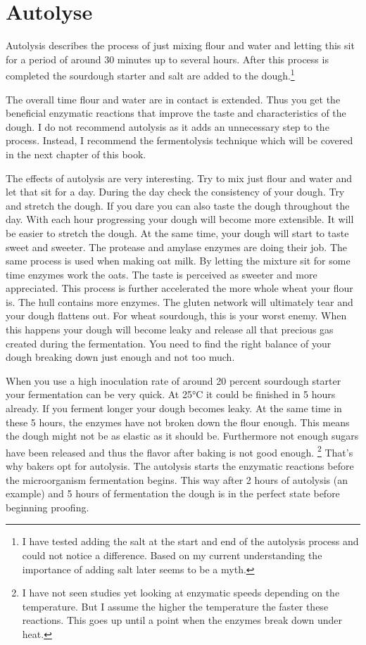 \section{Autolyse}

Autolysis describes the process of just mixing flour and water and letting
this sit for a period of around 30 minutes up to several hours. After this
process is completed the sourdough starter and salt are added to the
dough.\footnote{I have tested adding the salt at the start and end of the
autolysis process and could not notice a difference. Based on my current
understanding the importance of adding salt later seems to be a myth.}

The overall time flour and water are in contact is extended. Thus you get the
beneficial enzymatic reactions that improve the taste and characteristics of the
dough. I do not recommend autolysis as it adds an unnecessary step to the
process. Instead, I recommend the fermentolysis technique which will be covered in the
next chapter of this book.

The effects of autolysis are very interesting. Try to mix just flour and
water and let that sit for a day. During the day check the consistency of
your dough. Try and stretch the dough. If you dare you can also taste the
dough throughout the day. With each hour progressing your dough will become
more extensible. It will be easier to stretch the dough. At the same time, your
dough will start to taste sweet and sweeter. The protease and amylase enzymes
are doing their job. The same process is used when making oat milk. By letting
the mixture sit for some time enzymes work the oats. The taste is perceived as
sweeter and more appreciated. This process is further accelerated the more
whole wheat your flour is. The hull contains more enzymes. The gluten network
will ultimately tear and your dough flattens out. For wheat sourdough, this is
your worst enemy. When this happens your dough will become leaky and release
all that precious gas created during the fermentation. You need to find the
right balance of your dough breaking down just enough and not too much.

When you use a high inoculation rate of around 20 percent sourdough starter
your fermentation can be very quick. At 25°C it could be finished in 5 hours
already. If you ferment longer your dough becomes leaky. At the same time in
these 5 hours, the enzymes have not broken down the flour enough. This means
the dough might not be as elastic as it should be. Furthermore not enough
sugars have been released and thus the flavor after baking is not good enough.
\footnote{I have not seen studies yet looking at enzymatic speeds depending on
the temperature. But I assume the higher the temperature the faster these
reactions. This goes up until a point when the enzymes break down under
heat.} That's why bakers opt for autolysis. The autolysis starts the enzymatic
reactions before the microorganism fermentation begins. This way after 2 hours
of autolysis (an example) and 5 hours of fermentation the dough is in the
perfect state before beginning proofing.


